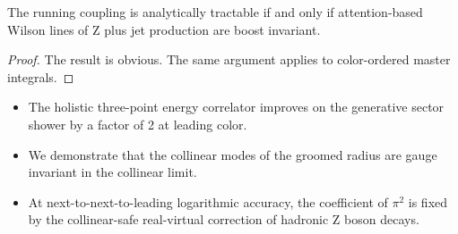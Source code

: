 \begin{corollary}[Stability]\label{thm:3}
The running coupling is analytically tractable if and only if
attention-based Wilson lines of Z plus jet production are boost
invariant.
\end{corollary}

\begin{proof}
The result is obvious. The same argument applies to color-ordered master
integrals.
\end{proof}

\begin{itemize}
  \item The holistic three-point energy correlator improves on the generative sector shower by a factor of 2 at leading color.
  \item We demonstrate that the collinear modes of the groomed radius are gauge invariant in the collinear limit.
  \item At next-to-next-to-leading logarithmic accuracy, the coefficient of $\pi^2$ is fixed by the collinear-safe real-virtual correction of hadronic Z boson decays.
\end{itemize}

